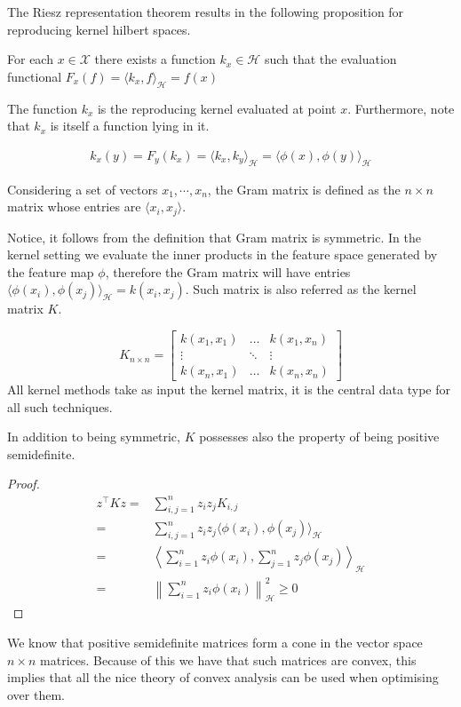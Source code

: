 The Riesz representation theorem results in the following proposition for reproducing kernel hilbert spaces.
\begin{proposition}
For each $x \in \mathcal{X}$ there exists a function $k_{x} \in \mathcal{H}$ such that the evaluation functional $F_{x}(f)=\langle k_{x}, f\rangle_{\mathcal{H}}=f(x)$    
\end{proposition}

The function $k_{x}$ is the reproducing kernel evaluated at point $x$.
Furthermore, note that $k_{x}$ is itself a function lying in it.

\begin{align*}
    k_{x}(y)=F_{y}(k_{x})=\langle k_{x}, k_{y}\rangle_{\mathcal{H}}=\langle \phi(x), \phi(y)\rangle_{\mathcal{H}}
\end{align*}



\begin{definition}
    Considering a set of vectors $x_1, \cdots, x_n$, the Gram matrix is defined as the $n\times n$ matrix whose entries are $\langle x_i, x_j \rangle$.    
\end{definition}

Notice, it follows from the definition that Gram matrix is symmetric.
In the kernel setting we evaluate the inner products in the feature space generated by the feature map $\phi$, therefore the Gram matrix will have entries $\langle \phi(x_i), \phi(x_j) \rangle_{\mathcal{H}}= k(x_i, x_j)$. Such matrix is also referred as the kernel matrix $K$.

\[
K_{n\times n}=
\begin{bmatrix}
    k(x_1,x_1)       &  \dots & k(x_1,x_n) \\
    \vdots       & \ddots & \vdots \\
    k(x_n, x_1)       & \dots & k(x_n, x_n)
\end{bmatrix}
\]
All kernel methods take as input the kernel matrix, it is the central data type for all 
such techniques.

\begin{proposition}
    In addition to being symmetric, $K$ possesses also the property of being positive semidefinite.    
\end{proposition}

\begin{proof}
    \begin{align}
        z^\intercal K z =& \sum_{i,j=1}^n z_i z_j K_{i,j}
        \\
        =& \sum_{i,j=1}^n z_i z_j \langle \phi(x_i), \phi(x_j) \rangle_{\mathcal{H}}
        \\
        =& \left\langle \sum_{i=1}^n z_i \phi(x_i), \sum_{j=1}^n z_j \phi(x_j)\right\rangle_{\mathcal{H}}
        \\
        =& \left\|\sum_{i=1}^n z_i \phi(x_i) \right\|_{\mathcal{H}}^2 \geq 0
    \end{align}
\end{proof}
We know that positive semidefinite matrices form a cone in the vector space $n\times n$ matrices. Because of this we have that such matrices are convex, this implies that all the nice theory of convex analysis can be used when optimising over them.


